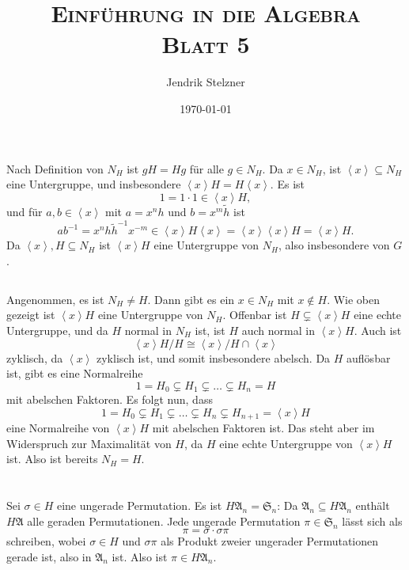 \documentclass[a4paper,10pt]{article}
\title{\textsc{Einführung in die Algebra \\ \Large Blatt 5}}
\author{Jendrik Stelzner}
\date{\today}
\theoremstyle{definition}
\newcommand{\Sn}{\mathfrak{S}}
\newcommand{\mf}[1]{\mathfrak{#1}}
\newcommand{\gen}[1]{\left\langle#1\right\rangle}
\begin{document}
\maketitle





\section{}


\subsection{}
Nach Definition von $N_H$ ist $gH = Hg$ für alle $g \in N_H$. Da $x \in N_H$, ist $\gen{x} \subseteq N_H$ eine Untergruppe, und insbesondere $\gen{x}H = H\gen{x}$.
Es ist
\[
 1 = 1 \cdot 1 \in \gen{x}H,
\]
und für $a,b \in \gen{x}$ mit $a = x^n h$ und $b = x^m \tilde{h}$ ist
\[
 ab^{-1} = x^n h \tilde{h}^{-1} x^{-m} \in \gen{x} H \gen{x} = \gen{x} \gen{x} H = \gen{x} H.
\]
Da $\gen{x}, H \subseteq N_H$ ist $\gen{x}H$ eine Untergruppe von $N_H$, also insbesondere von $G$.


\subsection{}
Angenommen, es ist $N_H \neq H$. Dann gibt es ein $x \in N_H$ mit $x \not\in H$. Wie oben gezeigt ist $\gen{x}H$ eine Untergruppe von $N_H$. Offenbar ist $H \subsetneq \gen{x}H$ eine echte Untergruppe, und da $H$ normal in $N_H$ ist, ist $H$ auch normal in $\gen{x}H$. Auch ist
\[
 \gen{x}\!H/H \cong \gen{x}/H \cap \gen{x}
\]
zyklisch, da $\gen{x}$ zyklisch ist, und somit insbesondere abelsch. Da $H$ auflösbar ist, gibt es eine Normalreihe
\[
 1 = H_0 \subsetneq H_1 \subsetneq \ldots \subsetneq H_n = H
\]
mit abelschen Faktoren. Es folgt nun, dass
\[
 1 = H_0 \subsetneq H_1 \subsetneq \ldots \subsetneq H_n \subsetneq H_{n+1} = \gen{x}H
\]
eine Normalreihe von $\gen{x}H$ mit abelschen Faktoren ist. Das steht aber im Widerspruch zur Maximalität von $H$, da $H$ eine echte Untergruppe von $\gen{x}H$ ist. Also ist bereits $N_H = H$.


\section{}

\subsection{}
Sei $\sigma \in H$ eine ungerade Permutation.
Es ist $H \mf{A}_n = \Sn_n$: Da $\mf{A}_n \subseteq H \mf{A}_n$ enthält $H\mf{A}$ alle geraden Permutationen. Jede ungerade Permutation $\pi \in \Sn_n$ lässt sich als
\[
 \pi = \sigma \cdot \sigma \pi
\]
schreiben, wobei $\sigma \in H$ und $\sigma \pi$ als Produkt zweier ungerader Permutationen gerade ist, also in $\mf{A}_n$ ist. Also ist $\pi \in H \mf{A}_n$.
\end{document}
